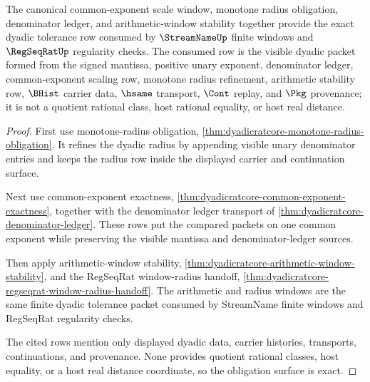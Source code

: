 \begin{theorem}
\label{thm:dyadicratcore-scale-window-obligation-surface}
The canonical common-exponent scale window, monotone radius obligation, denominator ledger, and arithmetic-window stability together provide the exact dyadic tolerance row consumed by $\StreamNameUp$ finite windows and $\RegSeqRatUp$ regularity checks. The consumed row is the visible dyadic packet formed from the signed mantissa, positive unary exponent, denominator ledger, common-exponent scaling row, monotone radius refinement, arithmetic stability row, $\BHist$ carrier data, $\hsame$ transport, $\Cont$ replay, and $\Pkg$ provenance; it is not a quotient rational class, host rational equality, or host real distance.
\end{theorem}
\begin{proof}
First use monotone-radius obligation, \autoref{thm:dyadicratcore-monotone-radius-obligation}. It refines the dyadic radius by appending visible unary denominator entries and keeps the radius row inside the displayed carrier and continuation surface.

Next use common-exponent exactness, \autoref{thm:dyadicratcore-common-exponent-exactness}, together with the denominator ledger transport of \autoref{thm:dyadicratcore-denominator-ledger}. These rows put the compared packets on one common exponent while preserving the visible mantissa and denominator-ledger sources.

Then apply arithmetic-window stability, \autoref{thm:dyadicratcore-arithmetic-window-stability}, and the RegSeqRat window-radius handoff, \autoref{thm:dyadicratcore-regseqrat-window-radius-handoff}. The arithmetic and radius windows are the same finite dyadic tolerance packet consumed by StreamName finite windows and RegSeqRat regularity checks.

The cited rows mention only displayed dyadic data, carrier histories, transports, continuations, and provenance. None provides quotient rational classes, host equality, or a host real distance coordinate, so the obligation surface is exact.
\end{proof}

